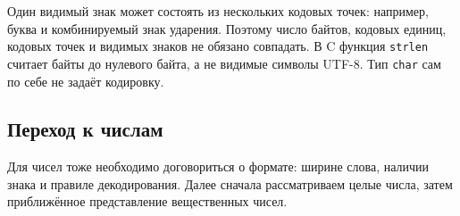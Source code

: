 Один видимый знак может состоять из нескольких кодовых точек:
например, буква и комбинируемый знак ударения. Поэтому число байтов,
кодовых единиц, кодовых точек и видимых знаков не обязано совпадать.
В C функция \texttt{strlen} считает байты до нулевого байта,
а не видимые символы UTF-8. Тип \texttt{char} сам по себе не задаёт кодировку.

\subsection*{Переход к числам}
Для чисел тоже необходимо договориться о формате: ширине слова,
наличии знака и правиле декодирования. Далее сначала рассматриваем
целые числа, затем приближённое представление вещественных чисел.
